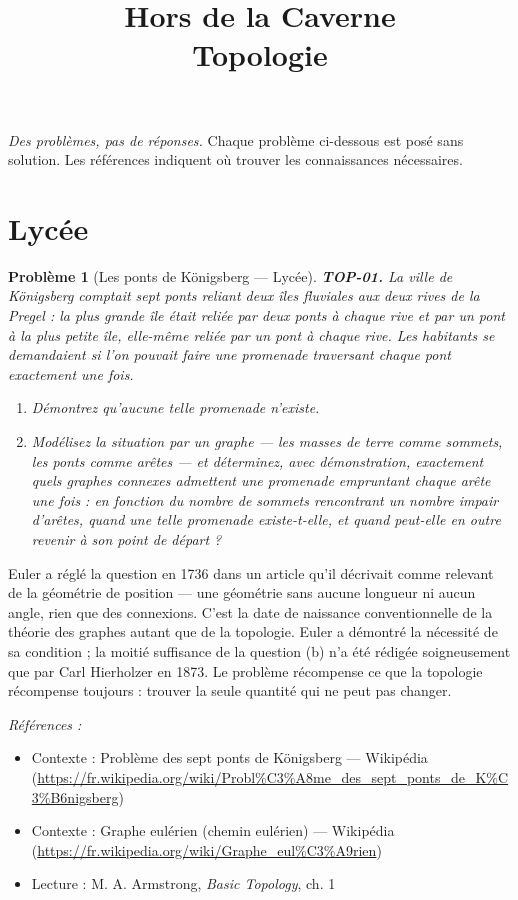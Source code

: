 \documentclass[11pt]{article}
\title{Hors de la Caverne \\ \Large Topologie}
\author{}
\date{}
\newtheorem{problem}{Problème}
\newenvironment{refs}{\par\small\noindent\emph{Références :}\begin{itemize}\setlength\itemsep{0pt}}{\end{itemize}\normalsize}
\begin{document}
\maketitle
\noindent\emph{Des problèmes, pas de réponses.} Chaque problème ci-dessous est posé
sans solution. Les références indiquent où trouver les connaissances nécessaires.
\medskip


\section*{Lycée}

\begin{problem}[{Les ponts de Königsberg --- Lycée}]
\textbf{TOP-01.} La ville de Königsberg comptait sept ponts reliant deux îles fluviales aux deux
rives de la Pregel : la plus grande île était reliée par deux ponts à chaque rive et par un pont à la
plus petite île, elle-même reliée par un pont à chaque rive. Les habitants se demandaient si l'on
pouvait faire une promenade traversant chaque pont exactement une fois.
\begin{enumerate}
\item[(a)] Démontrez qu'aucune telle promenade n'existe.
\item[(b)] Modélisez la situation par un graphe --- les masses de terre comme sommets, les ponts comme arêtes
--- et déterminez, avec démonstration, exactement quels graphes connexes admettent une promenade
empruntant chaque arête une fois : en fonction du nombre de sommets rencontrant un nombre impair
d'arêtes, quand une telle promenade existe-t-elle, et quand peut-elle en outre revenir à son point de
départ ?
\end{enumerate}

\end{problem}

\noindent Euler a réglé la question en 1736 dans un article qu'il décrivait comme relevant de
la \og{} géométrie de position \fg{} --- une géométrie sans aucune longueur ni aucun angle, rien que des
connexions. C'est la date de naissance conventionnelle de la théorie des graphes autant que de la
topologie. Euler a démontré la nécessité de sa condition ; la moitié \og{} suffisance \fg{} de la question (b)
n'a été rédigée soigneusement que par Carl Hierholzer en 1873. Le problème récompense ce que la
topologie récompense toujours : trouver la seule quantité qui ne peut pas changer.

\begin{refs}
\item Contexte : Problème des sept ponts de Königsberg --- Wikipédia (\url{https://fr.wikipedia.org/wiki/Probl%C3%A8me_des_sept_ponts_de_K%C3%B6nigsberg})
\item Contexte : Graphe eulérien (chemin eulérien) --- Wikipédia (\url{https://fr.wikipedia.org/wiki/Graphe_eul%C3%A9rien})
\item Lecture : M. A. Armstrong, \textit{Basic Topology}, ch. 1
\end{refs}
\end{document}
